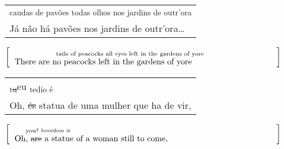 \begin{paper}
\newpage
\null
\vfill

\begin{figure}[H]

    \begin{center}
    \begin{tabular}{p{}}
        \hspace{3.5em}\textsubscript{caudas de pavões todas olhos nos jardins de outr'ora}  \\
        Já não há pavões nos jardins de outr'ora\ldots{}\\
    \end{tabular}
    \end{center}
    
    \begin{center}
    \begin{equation*}
	\left[\begin{tabular}{p{.9\textwidth}}
   		\text{\hspace{5em}\textsubscript{tails of peacocks all eyes left in the gardens of yore}} \\
        \text{There are no peacocks  left in the gardens of yore} \\
	\end{tabular}\right]
    \end{equation*}
    \end{center}

\subfigure[Line 45]{
    \centering\small
    \hspace{\textwidth}
    \label{fig:defenu4a}
}
    \begin{center}
    \begin{tabular}{p{}}
        \hspace{1em}\textsubscript{t\sout{u}}\scriptsize eu \small\textsubscript{tedio é}\\
        Oh, \sout{és} statua de uma mulher que ha de vir,\\
    \end{tabular}
    \end{center}
    
    \begin{center}
    \begin{equation*}
	\left[\begin{tabular}{p{.9\textwidth}}
   		\text{\hspace{1em} \textsubscript{you}\scriptsize{r} \small \textsubscript{boredom is}}\\
        \text{Oh, \sout{are} a statue of a woman still to come,}\\
	\end{tabular}\right]
    \end{equation*}
    \end{center}


\end{figure}
\end{paper}
